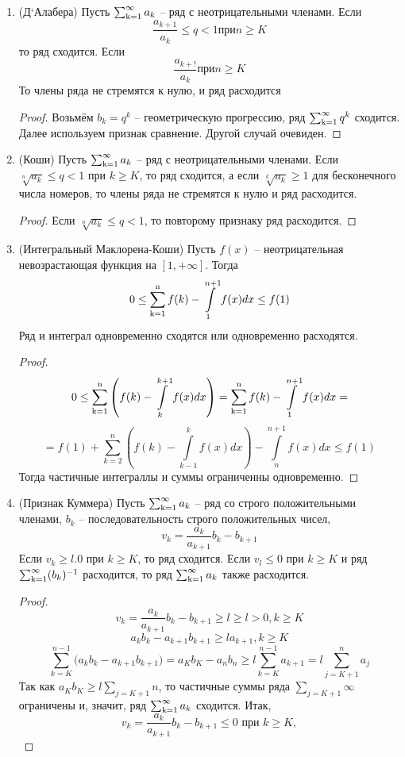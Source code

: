 \begin{enumerate}
\begin{proof}
\end{proof}
\item
(Д`Алабера) Пусть $\operatorname{\sum_{k=1}^{\infty}} a_k$ -- ряд с неотрицательными членами. Если
$$\frac{a_{k+1}}{a_k} \le q < 1 \text{при} n\ge K$$
то ряд сходится. Если
$$ \frac{a_{k+!}}{a_k} \text{при} n\ge K$$
То члены ряда не стремятся к нулю, и ряд расходится
\begin{proof}
Возьмём $b_k = q^k$ -- геометрическую прогрессию, ряд $\operatorname{\sum_{k=1}^{\infty}} q^k$ сходится.
Далее используем признак сравнение. Другой случай очевиден.
\end{proof}
\item
(Коши) Пусть $\operatorname{\sum_{k=1}^{\infty}} a_k$ -- ряд с неотрицательными членами. Если $ \sqrt[n]{a_k}\le q < 1$ при $k \ge K $,
то ряд сходится, а если $ \sqrt[k]{a_k}\ge 1$ для бесконечного числа номеров, то члены ряда не стремятся к нулю и ряд расходится.
\begin{proof}
Если  $\sqrt[n]{a_k}\le q < 1$, то повторому признаку ряд расходится. 
\end{proof}
\item
(Интегральный Маклорена-Коши) Пусть $f(x)$ -- неотрицательная невозрастающая функция на $ [1,+\infty] $. Тогда
$$ 0 \le \operatorname{\sum_{k=1}^{n}} f(k) - \int\limits_1^{n+1}f(x)dx\le f(1)$$
Ряд и интеграл одновременно сходятся или одновременно расходятся.
\begin{proof}
$$ 0\le \operatorname{\sum_{k=1}^{n}} \left( f(k) - \int\limits_k^{k+1}f(x)dx \right) = \operatorname{\sum_{k=1}^{n}} f(k) - \int\limits_1^{n+1}f(x)dx = $$
$$ = f(1)+\sum_{k=2}^n \left( f(k) - \int\limits_{k-1}^k f(x)dx \right) - \int\limits_n^{n+1} f(x)dx \le f(1)$$
Тогда частичные интеграллы и суммы ограниченны одновременно.
\end{proof}
\item
(Признак Куммера) Пусть $\operatorname{\sum_{k=1}^{\infty}} a_k$ -- ряд со строго положительными членами,
$b_k$ -- последовательность строго положительных чисел, $$ v_k = \frac{a_k}{a_{k+1}}b_k - b_{k+1}$$
Если $v_k \ge l . 0$ при $k \ge K$, то ряд сходится. Если $v_l \le 0$ при $k \ge K$ и ряд $\operatorname{\sum_{k=1}^{\infty}} (b_k)^{-1}$ расходится, то ряд $\operatorname{\sum_{k=1}^{\infty}} a_k$ также расходится.
\begin{proof}
$$v_k = \frac{a_k}{a_{k+1}} b_k - b_{k+1} \ge l \ge l > 0, k \ge K$$
$$a_k b_k-a_{k+1}b_{k+1} \ge l a_{k+1}, k\ge K$$
$$\sum_{k=K}^{n-1} \big( a_k b_k-a_{k+1}b_{k+1} \big) = a_Kb_K - a_nb_n \ge l \sum_{k=K}^{n-1} a_{k+1} = l \sum_{j=K+1}^{n}a_{j}$$
Так как $a_Kb_K \ge l\sum_{j=K+1}{n}$, то частичные суммы ряда $\sum_{j=K+1}{\infty}$ ограничены и, значит, ряд $\operatorname{\sum_{k=1}^{\infty}} a_k$ сходится.
Итак, $$v_k = \frac{a_k}{a_{k+1}}b_k - b_{k+1} \le 0 \text{ при } k\ge K,$$

\end{proof}
\end{enumerate}
